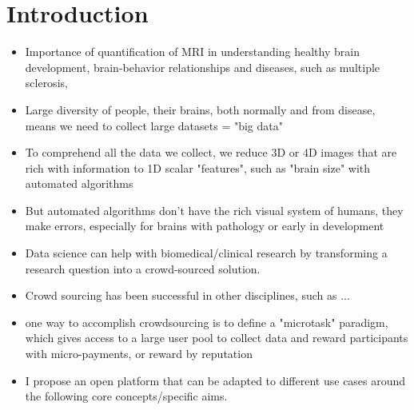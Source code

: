 \section{Introduction}
\begin{itemize}
\item Importance of quantification of MRI in understanding healthy brain development\cite{giedd1999brain}, brain-behavior relationships\cite{biswal2010toward} and diseases, such as multiple sclerosis\cite{bakshi2008mri}, 
\item Large diversity of people, their brains, both normally and from disease, means we need to collect large datasets = "big data"
\item To comprehend all the data we collect, we reduce 3D or 4D images that are rich with information to 1D scalar "features", such as "brain size" with automated algorithms
\item But automated algorithms don't have the rich visual system of humans, they make errors, especially for brains with pathology or early in development
\item Data science can help with biomedical/clinical research by transforming a research question into a crowd-sourced solution. 
\item Crowd sourcing has been successful in other disciplines, such as ...
\item one way to accomplish crowdsourcing is to define a "microtask" paradigm, which gives access to a large user pool to collect data and reward participants with micro-payments, or reward by reputation \cite{kittur2008crowdsourcing}
\item I propose an open platform that can be adapted to different use cases around the following core concepts/specific aims.
\end{itemize}

